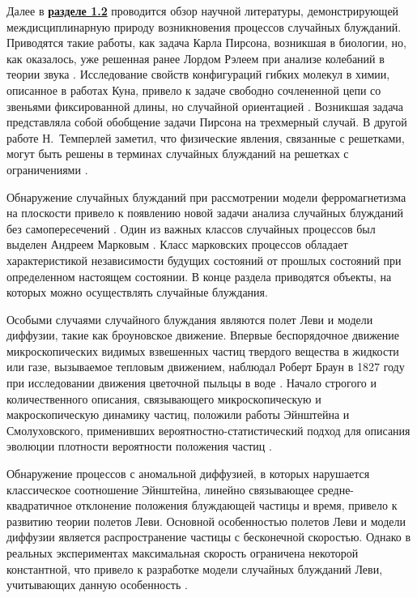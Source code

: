 Далее в \underline{\textbf{разделе 1.2}} проводится обзор научной литературы, демонстрирующей междисциплинарную природу возникновения процессов случайных блужданий. Приводятся такие работы, как задача Карла Пирсона, возникшая в биологии, но, как оказалось, уже решенная ранее Лордом Рэлеем при анализе колебаний в теории звука \cite{pearson_problem_1905,rayleigh_problem_1905}. Исследование свойств конфигураций гибких молекул в химии, описанное в работах Куна, привело к задаче свободно сочлененной цепи со звеньями фиксированной длины, но случайной ориентацией \cite{kuhn_uber_1930}. Возникшая задача представляла собой обобщение задачи Пирсона на трехмерный случай. В другой работе Н.~Темперлей заметил, что физические явления, связанные с решетками, могут быть решены в терминах случайных блужданий на решетках с ограничениями \cite{temperley_combinatorial_1956}.

Обнаружение случайных блужданий при рассмотрении модели ферромагнетизма на плоскости привело к появлению новой задачи анализа случайных блужданий без самопересечений \cite{gee_interaction_1946}. Один из важных классов случайных процессов был выделен Андреем Марковым \cite{markov_wahrscheinlichkeitsrechnung_1912}. Класс марковских процессов обладает характеристикой независимости будущих состояний от прошлых состояний при определенном настоящем состоянии. В конце раздела приводятся объекты, на которых можно осуществлять случайные блуждания.

Особыми случаями случайного блуждания являются полет Леви и модели диффузии, такие как броуновское движение. Впервые беспорядочное движение микроскопических видимых взвешенных частиц твердого вещества в жидкости или газе, вызываемое тепловым движением, наблюдал Роберт Браун в 1827 году при исследовании движения цветочной пыльцы в воде \cite{brown_brief_2015}. Начало строгого и количественного описания, связывающего микроскопическую и макроскопическую динамику частиц, положили работы Эйнштейна и Смолуховского, применивших вероятностно-статистический подход для описания эволюции плотности вероятности положения частиц \cite{einstein_uber_1905,vonsmoluchowski_zur_1906}.

Обнаружение процессов с аномальной диффузией, в которых нарушается классическое соотношение Эйнштейна, линейно связывающее средне-квадратичное отклонение положения блуждающей частицы и время, привело к развитию теории полетов Леви. Основной особенностью полетов Леви и модели диффузии является распространение частицы с бесконечной скоростью. Однако в реальных экспериментах максимальная скорость ограничена некоторой константной, что привело к разработке модели случайных блужданий Леви, учитывающих данную особенность \cite{gnedenko_predelnye_1949}.

